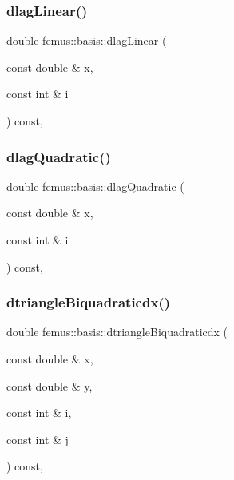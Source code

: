 \mbox{\label{classfemus_1_1basis_af771f9a5c71d06c873d474cf2bba3177}} 
\subsubsection{\texorpdfstring{dlag\+Linear()}{dlagLinear()}}
{\footnotesize\ttfamily double femus\+::basis\+::dlag\+Linear (\begin{DoxyParamCaption}\item[{const double \&}]{x,  }\item[{const int \&}]{i }\end{DoxyParamCaption}) const\hspace{0.3cm}{\ttfamily [inline]}, {\ttfamily [protected]}}

\mbox{\label{classfemus_1_1basis_aba954c5565d837822ee4840f1ed77f33}} 
\subsubsection{\texorpdfstring{dlag\+Quadratic()}{dlagQuadratic()}}
{\footnotesize\ttfamily double femus\+::basis\+::dlag\+Quadratic (\begin{DoxyParamCaption}\item[{const double \&}]{x,  }\item[{const int \&}]{i }\end{DoxyParamCaption}) const\hspace{0.3cm}{\ttfamily [inline]}, {\ttfamily [protected]}}

\mbox{\label{classfemus_1_1basis_aa2007487d021857ff90ba9c3366e54ba}} 
\subsubsection{\texorpdfstring{dtriangle\+Biquadraticdx()}{dtriangleBiquadraticdx()}}
{\footnotesize\ttfamily double femus\+::basis\+::dtriangle\+Biquadraticdx (\begin{DoxyParamCaption}\item[{const double \&}]{x,  }\item[{const double \&}]{y,  }\item[{const int \&}]{i,  }\item[{const int \&}]{j }\end{DoxyParamCaption}) const\hspace{0.3cm}{\ttfamily [inline]}, {\ttfamily [protected]}}


